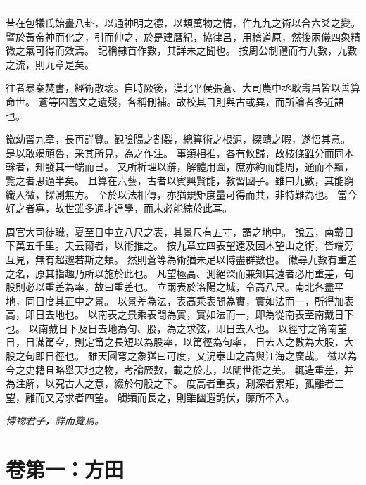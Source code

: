 \documentclass[11pt,a4paper]{article}
\newenvironment{prefacetext}{%
  \par\vspace{0.5em}\noindent\textcolor{prefacecolor}{\small}%
  \ignorespaces
}{\par\vspace{0.5em}}
\begin{document}
\begin{center}
\rule{0.5\textwidth}{0.4pt}
\end{center}

\begin{prefacetext}
昔在包犧氏始畫八卦，以通神明之德，以類萬物之情，作九九之術以合六爻之變。
暨於黃帝神而化之，引而伸之，於是建曆紀，協律呂，用稽道原，然後兩儀四象精微之氣可得而效焉。
記稱隸首作數，其詳未之聞也。
按周公制禮而有九數，九數之流，則九章是矣。

往者暴秦焚書，經術散壞。自時厥後，漢北平侯張蒼、大司農中丞耿壽昌皆以善算命世。
蒼等因舊文之遺殘，各稱刪補。故校其目則與古或異，而所論者多近語也。

徽幼習九章，長再詳覽。觀陰陽之割裂，總算術之根源，探賾之暇，遂悟其意。
是以敢竭頑魯，采其所見，為之作注。
事類相推，各有攸歸，故枝條雖分而同本榦者，知發其一端而已。
又所析理以辭，解體用圖，庶亦約而能周，通而不黷，覽之者思過半矣。
且算在六藝，古者以賓興賢能，教習國子。雖曰九數，其能窮纖入微，探測無方。
至於以法相傳，亦猶規矩度量可得而共，非特難為也。
當今好之者寡，故世雖多通才達學，而未必能綜於此耳。

周官大司徒職，夏至日中立八尺之表，其景尺有五寸，謂之地中。
說云，南戴日下萬五千里。夫云爾者，以術推之。
按九章立四表望遠及因木望山之術，皆端旁互見，無有超邈若斯之類。
然則蒼等為術猶未足以博盡群數也。
徽尋九數有重差之名，原其指趣乃所以施於此也。
凡望極高、測絕深而兼知其遠者必用重差，句股則必以重差為率，故曰重差也。
立兩表於洛陽之城，令高八尺。南北各盡平地，同日度其正中之景。
以景差為法，表高乘表間為實，實如法而一，所得加表高，即日去地也。
以南表之景乘表間為實，實如法而一，即為從南表至南戴日下也。
以南戴日下及日去地為句、股，為之求弦，即日去人也。
以徑寸之筩南望日，日滿筩空，則定筩之長短以為股率，以筩徑為句率，
日去人之數為大股，大股之句即日徑也。
雖天圓穹之象猶曰可度，又況泰山之高與江海之廣哉。
徽以為今之史籍且略舉天地之物，考論厥數，載之於志，以闡世術之美。
輒造重差，并為注解，以究古人之意，綴於句股之下。
度高者重表，測深者累矩，孤離者三望，離而又旁求者四望。
觸類而長之，則雖幽遐詭伏，靡所不入。
\end{prefacetext}

\begin{flushright}
\textit{博物君子，詳而覽焉。}
\end{flushright}

\newpage


\section{卷第一：方田}
\label{sec:fangtian}
\end{document}
